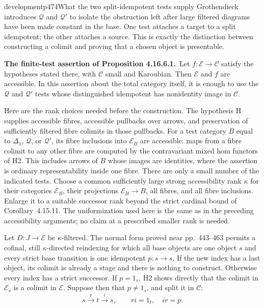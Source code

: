 \begin{dcomment}{development}{p474}{What the two split-idempotent tests supply}
Grothendieck introduces $\mathcal Q$ and $\mathcal Q'$ to isolate the obstruction left after large filtered diagrams have been made constant in the base. One test attaches a target to a split idempotent; the other attaches a source. This is exactly the distinction between constructing a colimit and proving that a chosen object is presentable.

\textbf{The finite-test assertion of Proposition 4.16.6.1.}\ours\
Let $f:\mathcal E\to\mathcal C$ satisfy the hypotheses stated there, with $\mathcal C$ small and Karoubian. Then $\mathcal E$ and $f$ are accessible. In this assertion about the total category itself, it is enough to use the $\mathcal Q$ and $\mathcal Q'$ tests whose distinguished idempotent has nonidentity image in $\mathcal C$.

Here are the rank choices needed before the construction. The hypothesis H supplies accessible fibres, accessible pullbacks over arrows, and preservation of sufficiently filtered fibre colimits in those pullbacks. For a test category $B$ equal to $\Delta_1$, $\mathcal Q$, or $\mathcal Q'$, its fibre inclusions into $\mathcal E_B$ are accessible: maps from a fibre colimit to any other fibre are computed by the contravariant mixed hom functors of H2. This includes arrows of $B$ whose images are identities, where the assertion is ordinary representability inside one fibre. There are only a small number of the indicated tests. Choose a common sufficiently large strong accessibility rank $\kappa$ for their categories $\mathcal E_B$, their projections $\mathcal E_B\to B$, all fibres, and all fibre inclusions. Enlarge it to a suitable successor rank beyond the strict cardinal bound of Corollary~4.15.11. The uniformization used here is the same as in the preceding accessibility arguments; no claim at a prescribed smaller rank is needed.

Let $D:J\to\mathcal E$ be $\kappa$-filtered. The normal form proved near pp.~443--463 permits a cofinal, still $\kappa$-directed reindexing for which all base objects are one object $s$ and every strict base transition is one idempotent $p:s\to s$. If the new index has a last object, its colimit is already a stage and there is nothing to construct. Otherwise every index has a strict successor. If $p=1_s$, H2 shows directly that the colimit in $\mathcal E_s$ is a colimit in $\mathcal E$. Suppose then that $p\ne1_s$, and split it in $\mathcal C$:
\[
 s\xrightarrow{r}t\xrightarrow{i}s,
 \qquad ri=1_t,\quad ir=p.
\]


\end{dcomment}
